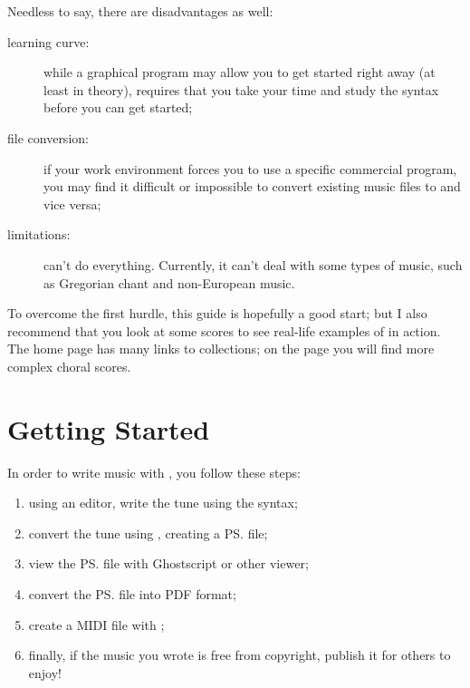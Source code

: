 \documentclass[a4paper,fullpage,12pt]{book}
\begin{document}
Needless to say, there are disadvantages as well:

\begin{description}
  
  \item [learning curve:] while a graphical program may allow you to
  get started right away (at least in theory), \ABC{} requires that
  you take your time and study the syntax before you can get started;
  
  \item [file conversion:] if your work environment forces you to use a
  specific commercial program, you may find it difficult or impossible
  to convert existing music files to \ABC{} and vice versa;
  
  \item [limitations:] \ABC{} can't do everything. Currently, it can't
  deal with some types of music, such as Gregorian chant and
  non-European music.
  
\end{description}

To overcome the first hurdle, this guide is hopefully a good start;
but I also recommend that you look at some scores to see real-life
examples of \ABC{} in action. The \ABC{} home page has many links to
\ABC{} collections; on the \ABCPLUS{} page you will find more complex
choral scores.



\section{Getting Started}

In order to write music with \ABC, you follow these steps:

\begin{enumerate}
  
  \item using an editor, write the tune using the \ABC{} syntax;
  
  \item convert the tune using \abcm{}, creating a \ps{} file;
  
  \item view the \ps{} file with Ghostscript or other viewer;
  
  \item convert the \ps{} file into PDF format;
  
  \item create a MIDI file with \abcmid;
  
  \item finally, if the music you wrote is free from copyright, publish
  it for others to enjoy!
  
\end{enumerate}
\end{document}
